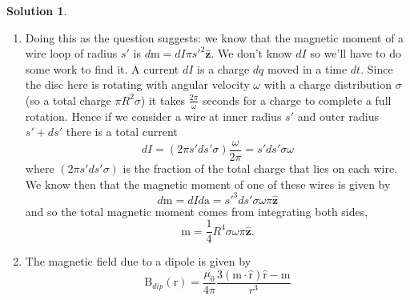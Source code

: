 \documentclass[10pt]{article}
\theoremstyle{definition}
\newtheorem{soln}{Solution}
\newcommand{\uz}{\hat{\mathbf{z}}}
\newcommand{\uv}[1]{\hat{\bv{{#1}}}}
\newcommand{\bv}[1]{\bm{\mathrm{#1}}}
\begin{document}
\begin{soln}
\begin{enumerate}[label=(\alph*)]
\begin{align*}
          \end{align*}
          here we let $u=s'^2+z^2\implies du =2s'ds'$ so that
          \begin{align*}
            \bv{B}(\bv{r}) & =\frac{\mu_0 \sigma \omega }{2}\int_{0}^{R} \frac{s'^3}{(u)^{3/2}}\frac{du}{2s'}\uz                                    \\
                           & =\frac{\mu_0 \sigma \omega }{4}\int_{0}^{R} \frac{u-z^2}{(u)^{3/2}}du\uz                                               \\
                           & =\frac{\mu_0 \sigma \omega }{4}\left[\int_{0}^{R} \frac{u}{(u)^{3/2}}du-\int_{0}^{R} \frac{z^2}{(u)^{3/2}}du\right]\uz \\
                           & =\frac{\mu_0 \sigma \omega }{4}\left[2\sqrt{u}+2\frac{z^2}{\sqrt{u}}\right]_{0}^{R}\uz                                 \\
                           & =\frac{\mu_0 \sigma \omega }{2}\left[\frac{R^2+2z^2}{\sqrt{R^2+z^2}}-\frac{2z^2}{\sqrt{z^2}}\right]\uz                 \\
                           & =\frac{\mu_0 \sigma \omega }{2}\left[\frac{R^2+2z^2}{\sqrt{R^2+z^2}}-2z\right]\uz
          \end{align*}
    \item Doing this as the question suggests: we know that the magnetic moment of a wire loop of radius $s'$ is $d\bv{m}=dI\pi s'^2\uz$.
          We don't know $dI$ so we'll have to do some work to find it. A current $dI$ is a charge $dq$ moved in a time $dt$. Since the disc here is rotating with angular
          velocity $\omega$ with a charge distribution $\sigma$ (so a total charge $\pi R^2 \sigma$) it takes $\frac{2\pi}{\omega}$ seconds for a charge to complete a full rotation.
          Hence if we consider a wire at inner radius $s'$ and outer radius $s'+ds'$ there is a total current
          $$dI=(2\pi s'ds' \sigma)\frac{\omega}{2\pi}=s'ds'\sigma\omega$$
          where $(2\pi s'ds' \sigma)$ is the fraction of the total charge that lies on each wire.
          We know then that the magnetic moment of one of these wires is given by
          $$d\bv{m}=dI d\bv{a}=s'^3ds'\sigma\omega\pi\uz$$
          and so the total magnetic moment comes from integrating both sides,
          $$\bv{m}=\frac{1}{4}R^4\sigma\omega\pi\uz.$$
    \item The magnetic field due to a dipole is given by
          $$\bv{B}_{dip}(\bv{r})=\frac{\mu_0}{4\pi}\frac{3\left(\bv{m}\cdot\uv{r}\right)\uv{r}-\bv{m}}{r^3}$$

\end{enumerate}
\end{soln}
\end{document}

